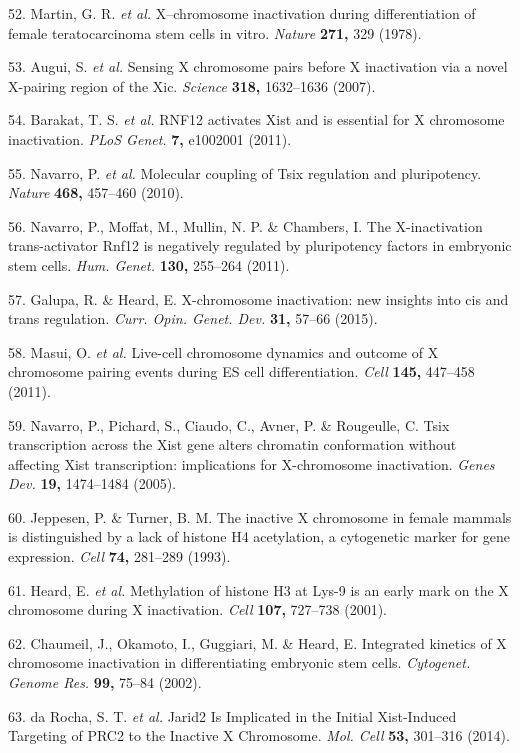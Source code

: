 \documentclass[11pt,twoside]{MPIthesis}
\theoremstyle{definition}
\theoremstyle{definition}
\theoremstyle{definition}
\theoremstyle{remark}
\begin{document}
52. Martin, G. R. \emph{et al.} X--chromosome inactivation during
differentiation of female teratocarcinoma stem cells in vitro.
\emph{Nature} \textbf{271,} 329 (1978).

53. Augui, S. \emph{et al.} Sensing X chromosome pairs before X
inactivation via a novel X-pairing region of the Xic. \emph{Science}
\textbf{318,} 1632--1636 (2007).

54. Barakat, T. S. \emph{et al.} RNF12 activates Xist and is essential
for X chromosome inactivation. \emph{PLoS Genet.} \textbf{7,} e1002001
(2011).

55. Navarro, P. \emph{et al.} Molecular coupling of Tsix regulation and
pluripotency. \emph{Nature} \textbf{468,} 457--460 (2010).

56. Navarro, P., Moffat, M., Mullin, N. P. \& Chambers, I. The
X-inactivation trans-activator Rnf12 is negatively regulated by
pluripotency factors in embryonic stem cells. \emph{Hum. Genet.}
\textbf{130,} 255--264 (2011).

57. Galupa, R. \& Heard, E. X-chromosome inactivation: new insights into
cis and trans regulation. \emph{Curr. Opin. Genet. Dev.} \textbf{31,}
57--66 (2015).

58. Masui, O. \emph{et al.} Live-cell chromosome dynamics and outcome of
X chromosome pairing events during ES cell differentiation. \emph{Cell}
\textbf{145,} 447--458 (2011).

59. Navarro, P., Pichard, S., Ciaudo, C., Avner, P. \& Rougeulle, C.
Tsix transcription across the Xist gene alters chromatin conformation
without affecting Xist transcription: implications for X-chromosome
inactivation. \emph{Genes Dev.} \textbf{19,} 1474--1484 (2005).

60. Jeppesen, P. \& Turner, B. M. The inactive X chromosome in female
mammals is distinguished by a lack of histone H4 acetylation, a
cytogenetic marker for gene expression. \emph{Cell} \textbf{74,}
281--289 (1993).

61. Heard, E. \emph{et al.} Methylation of histone H3 at Lys-9 is an
early mark on the X chromosome during X inactivation. \emph{Cell}
\textbf{107,} 727--738 (2001).

62. Chaumeil, J., Okamoto, I., Guggiari, M. \& Heard, E. Integrated
kinetics of X chromosome inactivation in differentiating embryonic stem
cells. \emph{Cytogenet. Genome Res.} \textbf{99,} 75--84 (2002).

63. da Rocha, S. T. \emph{et al.} Jarid2 Is Implicated in the Initial
Xist-Induced Targeting of PRC2 to the Inactive X Chromosome. \emph{Mol.
Cell} \textbf{53,} 301--316 (2014).
\end{document}
